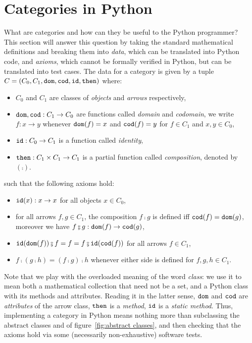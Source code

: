 
\section{Categories in Python}

What are categories and how can they be useful to the Python programmer?
This section will answer this question by taking the standard mathematical definitions and breaking them into \emph{data}, which can be translated into Python code, and \emph{axioms}, which cannot be formally verified in Python, but can be translated into test cases.
The data for a category is given by a tuple $C = (C_0, C_1, \mathtt{dom}, \mathtt{cod}, \mathtt{id}, \mathtt{then})$ where:
\begin{itemize}
\item $C_0$ and $C_1$ are classes of \emph{objects} and \emph{arrows} respectively,
\item $\mathtt{dom}, \mathtt{cod} : C_1 \to C_0$ are functions called \emph{domain} and \emph{codomain}, we write $f : x \to y$ whenever $\mathtt{dom}(f) = x$ and $\mathtt{cod}(f) = y$ for $f \in C_1$ and $x, y \in C_0$,
\item $\mathtt{id} : C_0 \to C_1$ is a function called \emph{identity},
\item $\mathtt{then} : C_1 \times C_1 \to C_1$ is a partial function called \emph{composition}, denoted by $(\fcmp)$.
\end{itemize}
such that the following axioms hold:
\begin{itemize}
\item $\mathtt{id}(x) : x \to x$ for all objects $x \in C_0$,
\item for all arrows $f, g \in C_1$, the composition $f \fcmp g$ is defined iff $\mathtt{cod}(f) = \mathtt{dom}(g)$, moreover we have $f \fcmp g : \dom(f) \to \cod(g)$,
\item $\id(\dom(f)) \fcmp f = f = f \fcmp \id(\cod(f))$ for all arrows $f \in C_1$,
\item $f \fcmp (g \fcmp h) = (f \fcmp g) \fcmp h$ whenever either side is defined for $f, g, h \in C_1$.
\end{itemize}
Note that we play with the overloaded meaning of the word \emph{class}: we use it to mean both a mathematical collection that need not be a set, and a Python class with its methods and attributes.
Reading it in the latter sense, $\mathtt{dom}$ and $\mathtt{cod}$ are \emph{attributes} of the arrow class, $\mathtt{then}$ is a \emph{method}, $\mathtt{id}$ is a \emph{static method}.
Thus, implementing a category in Python means nothing more than subclassing the  abstract classes  and  of figure~\ref{fig:abstract classes}, and then checking that the axioms hold via some (necessarily non-exhaustive) software tests.
